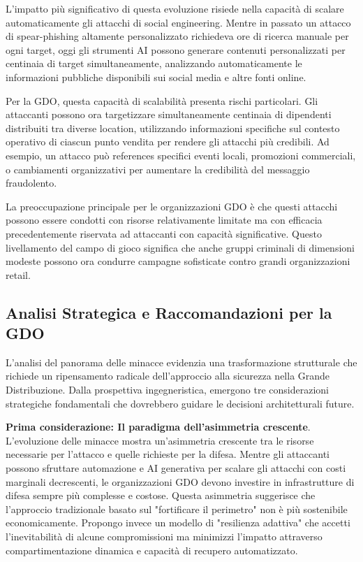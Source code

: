 {L'impatto più significativo di questa evoluzione risiede nella capacità di scalare automaticamente gli attacchi di social engineering. Mentre in passato un attacco di spear-phishing altamente personalizzato richiedeva ore di ricerca manuale per ogni target, oggi gli strumenti AI possono generare contenuti personalizzati per centinaia di target simultaneamente, analizzando automaticamente le informazioni pubbliche disponibili sui social media e altre fonti online.

Per la GDO, questa capacità di scalabilità presenta rischi particolari. Gli attaccanti possono ora targetizzare simultaneamente centinaia di dipendenti distribuiti tra diverse location, utilizzando informazioni specifiche sul contesto operativo di ciascun punto vendita per rendere gli attacchi più credibili. Ad esempio, un attacco può references specifici eventi locali, promozioni commerciali, o cambiamenti organizzativi per aumentare la credibilità del messaggio fraudolento.

La preoccupazione principale per le organizzazioni GDO è che questi attacchi possono essere condotti con risorse relativamente limitate ma con efficacia precedentemente riservata ad attaccanti con capacità significative. Questo livellamento del campo di gioco significa che anche gruppi criminali di dimensioni modeste possono ora condurre campagne sofisticate contro grandi organizzazioni retail.

\subsection{Analisi Strategica e Raccomandazioni per la GDO}

L'analisi del panorama delle minacce evidenzia una trasformazione strutturale che richiede un ripensamento radicale dell'approccio alla sicurezza nella Grande Distribuzione. Dalla prospettiva ingegneristica, emergono tre considerazioni strategiche fondamentali che dovrebbero guidare le decisioni architetturali future.

\textbf{Prima considerazione: Il paradigma dell'asimmetria crescente}. L'evoluzione delle minacce mostra un'asimmetria crescente tra le risorse necessarie per l'attacco e quelle richieste per la difesa. Mentre gli attaccanti possono sfruttare automazione e AI generativa per scalare gli attacchi con costi marginali decrescenti, le organizzazioni GDO devono investire in infrastrutture di difesa sempre più complesse e costose. Questa asimmetria suggerisce che l'approccio tradizionale basato sul "fortificare il perimetro" non è più sostenibile economicamente. Propongo invece un modello di "resilienza adattiva" che accetti l'inevitabilità di alcune compromissioni ma minimizzi l'impatto attraverso compartimentazione dinamica e capacità di recupero automatizzato.

}
